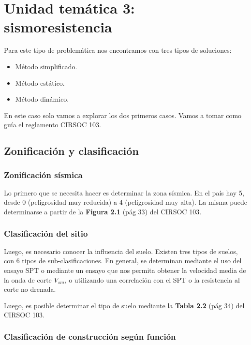 \documentclass[../main.tex]{subfiles}
\begin{document}
\section{Unidad temática 3: sismoresistencia}

Para este tipo de problemática nos encontramos con tres tipos de soluciones:

\begin{itemize}
  \item Método simplificado.
  \item Método estático.
  \item Método dinámico.
\end{itemize}

En este caso solo vamos a explorar los dos primeros casos. Vamos a tomar como
guía el reglamento CIRSOC 103.

\subsection{Zonificación y clasificación}

\subsubsection{Zonificación sísmica}

Lo primero que se necesita hacer es determinar la zona sísmica. En el país hay
5, desde 0 (peligrosidad muy reducida) a 4 (peligrosidad muy alta). La misma
puede determinarse a partir de la \textbf{Figura 2.1} (pág 33) del CIRSOC 103.

\subsubsection{Clasificación del sitio}

Luego, es necesario conocer la influencia del suelo. Existen tres tipos de
suelos, con 6 tipos de sub-clasificaciones. En general, se determinan mediante
el uso del ensayo SPT o mediante un ensayo que nos permita obtener la 
velocidad media de la onda de corte $V_{sm}$, o utilizando una correlación 
con el SPT o la resistencia al corte no drenada.

Luego, es posible determinar el tipo de suelo mediante la \textbf{Tabla 2.2} 
(pág 34) del CIRSOC 103. 

\subsubsection{Clasificación de construcción según función}
\end{document}
